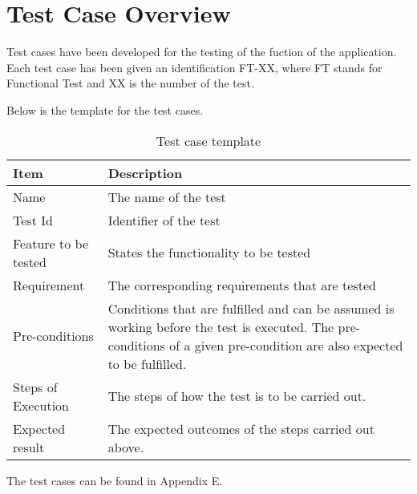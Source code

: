 \section{Test Case Overview}

Test cases have been developed for the testing of the fuction of the application. Each test case has been given an identification FT-XX, where FT stands for Functional Test and XX is the number of the test.

Below is the template for the test cases.

\begin{table}[H]
\centering
	\begin{tabular}{ l | p{8cm} }
		\hline
		{\bf Item} & {\bf Description} \\ \hline
		Name & The name of the test \\ 
		Test Id & Identifier of the test \\ 
		Feature to be tested & States the functionality to be tested \\ 
		Requirement & The corresponding requirements that are tested \\ 
		Pre-conditions & Conditions that are fulfilled and can be assumed is working before the test is executed. The pre-conditions of a given pre-condition are also expected to be fulfilled. \\ 
		Steps of Execution & The steps of how the test is to be carried out. \\ 
		Expected result & The expected outcomes of the steps carried out above. \\ 
	\end{tabular}
	\caption{Test case template}
\end{table}

The test cases can be found in Appendix E.